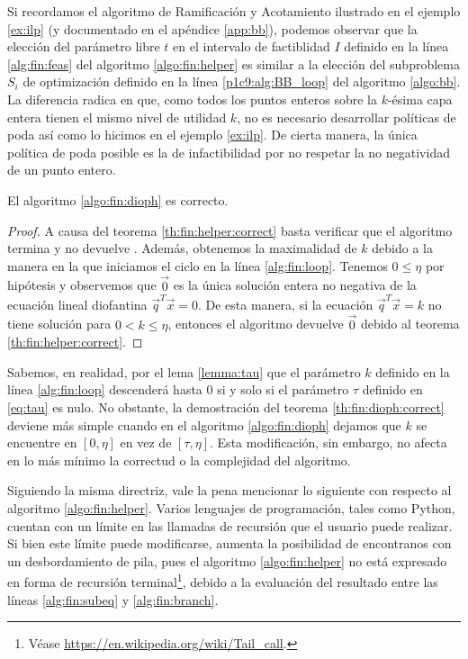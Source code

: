 Si recordamos el algoritmo de Ramificación y Acotamiento ilustrado en el ejemplo \ref{ex:ilp} (y
documentado en el apéndice \ref{app:bb}), podemos observar que la elección del parámetro libre $t$
en el intervalo de factiblidad $I$ definido en la línea \ref{alg:fin:feas} del algoritmo
\ref{algo:fin:helper} es similar a la elección del subproblema $S_i$ de optimización definido en la
línea \ref{p1c9:alg:BB_loop} del algoritmo \ref{algo:bb}. La diferencia radica en que, como todos
los puntos enteros sobre la $k$-ésima capa entera tienen el mismo nivel de utilidad $k$, no es
necesario desarrollar políticas de poda así como lo hicimos en el ejemplo \ref{ex:ilp}. De cierta
manera, la única política de poda posible es la de infactibilidad por no respetar la no negatividad
de un punto entero.
\begin{theorem}
	\label{th:fin:dioph:correct}
	El algoritmo \ref{algo:fin:dioph} es correcto.
\end{theorem}
\begin{proof}
	A causa del teorema \ref{th:fin:helper:correct} basta verificar que el algoritmo termina y no
	devuelve \NIL. Además, obtenemos la maximalidad de $k$ debido a la manera en la que iniciamos el
	ciclo en la línea \ref{alg:fin:loop}. Tenemos $0 \leq \eta$ por hipótesis y observemos que
	$\vec{0}$ es la única solución entera no negativa de la ecuación lineal diofantina
	$\vec{q}^T\vec{x} = 0$. De esta manera, si la ecuación $\vec{q}^T\vec{x} = k$ no tiene solución
	para $0 < k \leq \eta$, entonces el algoritmo devuelve $\vec{0}$ debido al teorema
	\ref{th:fin:helper:correct}.
\end{proof}

Sabemos, en realidad, por el lema \ref{lemma:tau} que el parámetro $k$ definido en la línea
\ref{alg:fin:loop} descenderá hasta 0 si y solo si el parámetro $\tau$ definido en \eqref{eq:tau}
es nulo. No obstante, la demostración del teorema \ref{th:fin:dioph:correct} deviene más simple
cuando en el algoritmo \ref{algo:fin:dioph} dejamos que $k$ se encuentre en $[0, \eta]$ en vez de
$[\tau, \eta]$. Esta modificación, sin embargo, no afecta en lo más mínimo la correctud o la
complejidad del algoritmo.

Siguiendo la misma directriz, vale la pena mencionar lo siguiente con respecto al algoritmo
\ref{algo:fin:helper}. Varios lenguajes de programación, tales como Python, cuentan con un límite en
las llamadas de recursión que el usuario puede realizar. Si bien este límite puede modificarse,
aumenta la posibilidad de encontranos con un desbordamiento de pila, pues el algoritmo
\ref{algo:fin:helper} no está expresado en forma de recursión terminal\footnote{Véase
\url{https://en.wikipedia.org/wiki/Tail_call}.}, debido a la evaluación del resultado entre las líneas
\ref{alg:fin:subeq} y \ref{alg:fin:branch}.

